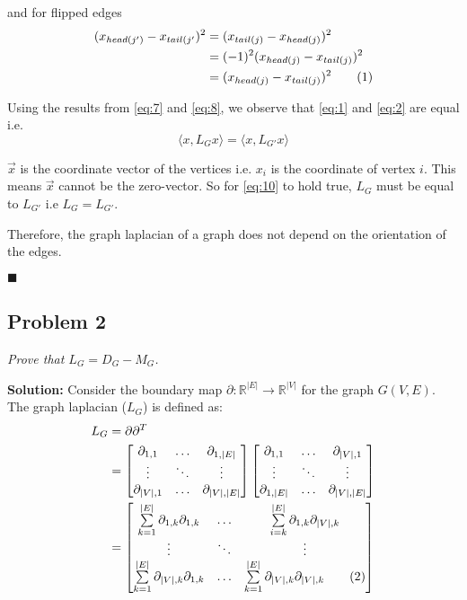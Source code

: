 \documentclass[12pt,a4paper]{article}
\newcommand\numberthis{\addtocounter{equation}{1}\tag{\theequation}}
\newcommand{\rightqed}{
\begin{flushright}
$\blacksquare$
\end{flushright}
}
\begin{document}
and for flipped edges
\begin{align*}
    (x_{head(j')} - x_{tail(j'})^2 &= (x_{tail(j)} - x_{head(j)})^2 \\
                                   &= (-1)^2(x_{head(j)} - x_{tail(j)})^2 \\
                                   &= (x_{head(j)} - x_{tail(j)})^2 \label{eq:8} \numberthis
\end{align*}

Using the results from \eqref{eq:7} and \eqref{eq:8}, we observe that \eqref{eq:1} and \eqref{eq:2} are equal i.e.
\begin{equation}
    \langle x, L_Gx \rangle = \langle x, L_{G'}x \rangle \label{eq:10}
\end{equation}

$\vec{x}$ is the coordinate vector of the vertices i.e. $x_i$ is the coordinate of vertex $i$. This means $\vec{x}$ cannot be the zero-vector. So for \eqref{eq:10} to hold true, $L_G$ must be equal to $L_{G'}$ i.e $L_G = L_{G'}$. 

Therefore, the graph laplacian of a graph does not depend on the orientation of the edges. \rightqed

\newpage
\subsection*{Problem 2}
\textit{
    Prove that $L_G = D_G - M_G$.
}

\noindent\textbf{Solution:}
Consider the boundary map $\partial:\mathbb{R}^{|E|} \rightarrow \mathbb{R}^{|V|}$ for the graph $G(V,E)$. The graph laplacian ($L_G$) is defined as:
\begin{align*}
    L_G &= \partial\partial^T \\
        &= \begin{bmatrix}
            \partial_{1,1} & \hdots & \partial_{1,|E|} \\
            \vdots         & \ddots & \vdots         \\
            \partial_{|V|,1} & \hdots & \partial_{|V|,|E|} \\
        \end{bmatrix}
        \begin{bmatrix}
            \partial_{1,1} & \hdots & \partial_{|V|,1} \\
            \vdots         & \ddots & \vdots         \\
            \partial_{1,|E|} & \hdots & \partial_{|V|,|E|} \\
        \end{bmatrix} \\
        &= \begin{bmatrix}
            \sum\limits_{k=1}^{|E|} \partial_{1,k}\partial_{1,k} & \hdots & \sum\limits_{i=k}^{|E|} \partial_{1,k}\partial_{|V|,k} \\
            \vdots & \ddots & \vdots \\
            \sum\limits_{k=1}^{|E|} \partial_{|V|,k}\partial_{1,k} & \hdots & \sum\limits_{k=1}^{|E|} \partial_{|V|,k}\partial_{|V|,k} \numberthis\\
        \end{bmatrix}
\end{align*}
\end{document}

